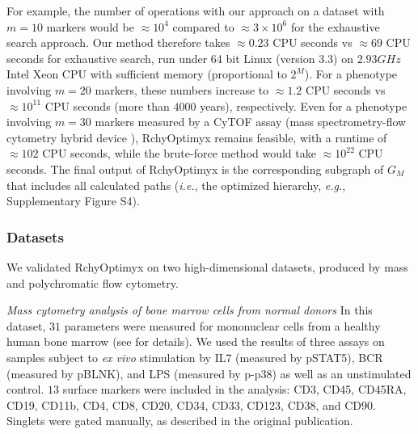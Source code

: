 For example, the number of operations with our approach on a dataset with $m=10$ markers would be $\approx 10^4$
compared to $\approx 3 \times 10^{6}$ for the exhaustive search approach.  
Our method therefore takes
$\approx 0.23$ CPU seconds vs $\approx 69$ CPU seconds for exhaustive search, run under 64 bit Linux (version 3.3) on $2.93GHz$
Intel Xeon CPU with sufficient memory (proportional to $2^M$). 
For a phenotype involving $m=20$ markers, these numbers increase to $\approx 1.2$ CPU seconds vs $\approx 10^{11}$ CPU
seconds (more than $4000$ years), respectively.  Even for a phenotype involving $m=30$ markers measured by a CyTOF assay
(mass spectrometry-flow cytometry hybrid device \cite{ornatsky2010highly,bendall2011single,Chattopadhyay2012Cytometry}),
RchyOptimyx remains feasible, with a runtime of $\approx 102$ CPU seconds, while the brute-force method would take
$\approx 10^{22}$ CPU seconds.  The final output of RchyOptimyx is the corresponding subgraph of $G_M$ that includes all
calculated paths (\emph{i.e.}, the optimized hierarchy, \emph{e.g.}, Supplementary Figure S4).



\subsubsection{Datasets}

We validated RchyOptimyx on two high-dimensional datasets, produced by mass and polychromatic flow cytometry.

\emph{Mass cytometry analysis of bone marrow cells from normal donors}
In this dataset, $31$ parameters were measured for mononuclear cells from a healthy human bone marrow (see  \cite{bendall2011single} for details).
We used the results of three assays on samples subject to \emph{ex vivo} stimulation by IL7 (measured by pSTAT5), BCR (measured by pBLNK), and LPS (measured by p-p38) as well as an unstimulated control.
$13$ surface markers were included in the analysis: CD3, CD45, CD45RA, CD19, CD11b, CD4, CD8, CD20, CD34, CD33, CD123, CD38, and CD90.
Singlets were gated manually, as described in the original publication.



